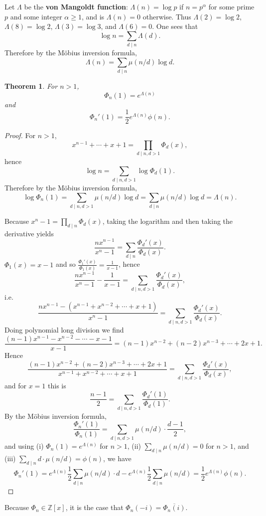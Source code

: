 \documentclass{amsart}
\newtheorem{theorem}{Theorem}
\theoremstyle{definition}
\begin{document}
Let $\Lambda$ be the \textbf{von Mangoldt function}: $\Lambda(n)=\log p$ if $n=p^\alpha$ for some prime $p$ and some integer
$\alpha \geq 1$, and is $\Lambda(n)=0$ otherwise. Thus $\Lambda(2)=\log 2$, $\Lambda(8)=\log 2$, $\Lambda(3)=\log 3$,
and $\Lambda(6) = 0$. One sees that
\[
\log n = \sum_{d \mid n} \Lambda(d).
\]
Therefore by the M\"obius inversion formula,
\[
\Lambda(n) = \sum_{d \mid n} \mu(n/d) \log d.
\]

\begin{theorem}
For $n>1$,
\[
\Phi_n(1) =  e^{\Lambda(n)}
\]
and
\[
\Phi_n'(1) =\frac{1}{2} e^{\Lambda(n)}  \phi(n).
\]
\label{specialvalues}
\end{theorem}
\begin{proof}
For $n>1$,
\[
x^{n-1}+\cdots+x+1 = \prod_{d \mid n, d>1} \Phi_d(x),
\]
hence
\[
\log n = \sum_{d \mid n, d>1} \log \Phi_d(1).
\]
Therefore by the M\"obius inversion formula,
\[
\log \Phi_n(1) = \sum_{d \mid n, d>1} \mu(n/d)  \log d = \sum_{d \mid n} \mu(n/d) \log d = \Lambda(n).
\]


Because $x^n-1 = \prod_{d \mid n} \Phi_d(x)$, taking the logarithm and then taking the derivative
yields
\[
\frac{nx^{n-1}}{x^n-1} = \sum_{d \mid n} \frac{\Phi_d'(x)}{\Phi_d(x)}.
\]
$\Phi_1(x) = x-1$ and so $\frac{\Phi_1'(x)}{\Phi_1(x)} = \frac{1}{x-1}$, hence
\[
\frac{nx^{n-1}}{x^n-1}  - \frac{1}{x-1} = \sum_{d \mid n, d>1} \frac{\Phi_d'(x)}{\Phi_d(x)},
\]
i.e.
\[
\frac{nx^{n-1} - (x^{n-1}+x^{n-2}+\cdots+x+1)}{x^n-1} = \sum_{d \mid n, d>1} \frac{\Phi_d'(x)}{\Phi_d(x)}.
\]
Doing polynomial long division we find
\[
\frac{(n-1)x^{n-1} - x^{n-2} - \cdots - x - 1}{x-1} = (n-1)x^{n-2} + (n-2)x^{n-3} + \cdots + 2x+1.
\]
Hence
\[
\frac{(n-1)x^{n-2} + (n-2)x^{n-3} + \cdots + 2x+1}{x^{n-1}+x^{n-2}+\cdots+x+1} =  \sum_{d \mid n, d>1} \frac{\Phi_d'(x)}{\Phi_d(x)},
\]
and for $x=1$ this is
\[
\frac{n-1}{2} = \sum_{d \mid n, d>1} \frac{\Phi_d'(1)}{\Phi_d(1)}.
\]
By the M\"obius inversion formula,
\[
\frac{\Phi_n'(1)}{\Phi_n(1)} = \sum_{d \mid n, d>1} \mu(n/d) \cdot  \frac{d-1}{2},
\]
and using (i) $\Phi_n(1) = e^{\Lambda(n)}$ for $n>1$, (ii) $\sum_{d \mid n} \mu(n/d) = 0$ for $n>1$,
and (iii) $\sum_{d \mid n} d \cdot \mu(n/d) = \phi(n)$, we have
\[
\Phi_n'(1) =  e^{\Lambda(n)} \frac{1}{2} \sum_{d \mid n} \mu(n/d) \cdot d -e^{\Lambda(n)} \frac{1}{2} \sum_{d \mid n} \mu(n/d)
=\frac{1}{2} e^{\Lambda(n)} \phi(n).
\]
\end{proof}





Because $\Phi_n \in \mathbb{Z}[x]$, it is the case that $\Phi_n(-i) = \overline{\Phi_n(i)}$.
\end{document}
